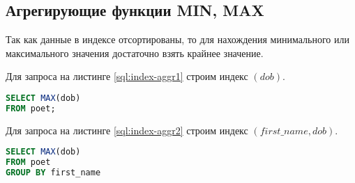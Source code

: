 \subsection{Агрегирующие функции MIN, MAX}

Так как данные в индексе отсортированы, то для нахождения минимального или максимального значения достаточно взять крайнее значение.

Для запроса на листинге \ref{sql:index-aggr1} строим индекс $(dob)$.
\begin{lstlisting}[language=sql, label=sql:index-aggr1, caption={запрос для index-aggr}]
SELECT MAX(dob) 
FROM poet;
\end{lstlisting}

Для запроса на листинге \ref{sql:index-aggr2} строим индекс $(first\_name, dob)$.
\begin{lstlisting}[language=sql, label=sql:index-aggr2, caption={запрос для index-aggr}]
SELECT MAX(dob) 
FROM poet
GROUP BY first_name
\end{lstlisting}
